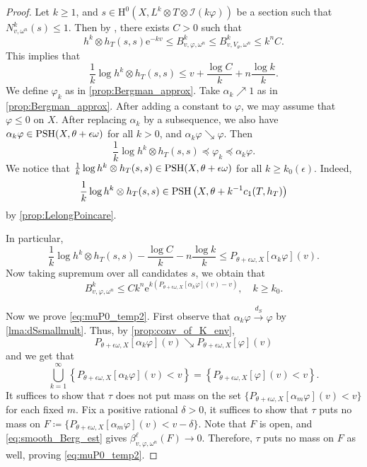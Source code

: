 \begin{proof}
Let $k\geq 1$, and $s \in \mathrm{H}^0(X,L^k \otimes T \otimes \mathcal I(k\varphi))$ be a section such that $N^k_{v,\omega^n}(s) \leq 1$. Then by \cite[Lemma~4.1]{Ber11}, there exists $C>0$ such that
\[
h^k\otimes h_T(s,s)\mathrm{e}^{-kv} \leq B^k_{v,\varphi,\omega^n} \leq B^k_{v,V_{\theta},\omega^n} \leq k^n C.
\]
This implies that
\[
\frac{1}{k}\log h^k \otimes h_T(s,s) \leq v + \frac{\log C }{k} + n \frac{\log k}{ k }.
\]
We define $\varphi_k$ as in \cref{prop:Bergman_approx}. Take $\alpha_k\nearrow 1$ as in \cref{prop:Bergman_approx}.
After adding a constant to $\varphi$, we may assume that $\varphi\leq 0$ on $X$. After replacing $\alpha_k$ by a subsequence, we also have $\alpha_k\varphi\in \mathrm{PSH}(X,\theta+\epsilon\omega)$ for all $k>0$, and $\alpha_k\varphi\searrow\varphi$.
Then
\[
\frac{1}{k}\log h^k \otimes h_T(s,s)\preceq \varphi_k\preceq \alpha_k\varphi.
\]
We notice that $\frac{1}{k}\log h^k \otimes h_T(s,s) \in \mathrm{PSH}(X, \theta + \epsilon \omega)$ for all $k \geq k_0(\epsilon)$.
Indeed,
\[
    \frac{1}{k}\log h^k\otimes h_T(s,s) \in \mathrm{PSH}\left(X,\theta+ k^{-1} c_1(T,h_T)\right)
\]
by \cref{prop:LelongPoincare}.


In particular,
\[
\frac{1}{k}\log h^k \otimes h_T(s,s)-\frac{\log C}{k}-n\frac{\log k}{k}\leq P_{\theta+\epsilon\omega,X}[\alpha_k \varphi](v).
\]
Now taking supremum over all candidates $s$, we obtain that
\begin{equation}\label{eq:smooth_Berg_est}
B^k_{v,\varphi,\omega^n} \leq C k^n \mathrm{e}^{k \left(P_{\theta +\epsilon \omega,X}[\alpha_k \varphi](v)-v\right)},\quad k \geq k_0.
\end{equation}

Now we prove \eqref{eq:muP0_temp2}. First observe that $\alpha_k\varphi\xrightarrow{d_S}\varphi$ by \cref{lma:dSsmallmult}. Thus, by \cref{prop:conv_of_K_env},
\[
P_{\theta +\epsilon \omega,X}[\alpha_k \varphi](v) \searrow P_{\theta +\epsilon \omega,X}[\varphi](v)
\]
and we get that
\[
\bigcup_{k=1}^{\infty}\left\{P_{\theta +\epsilon \omega,X}[\alpha_k \varphi](v) < v\right\}=\left\{P_{\theta +\epsilon \omega,X}[\varphi](v) < v\right\}.
\]
    It suffices to show that $\tau$ does not put mass on the set $\{P_{\theta +\epsilon \omega,X}[\alpha_m \varphi](v) < v\}$ for each fixed $m$. Fix a positive rational $\delta>0$, it suffices to show that $\tau$ puts no mass on $F\coloneqq \{P_{\theta +\epsilon \omega,X}[\alpha_m \varphi](v) < v-\delta\}$.
    Note that $F$ is open, and \eqref{eq:smooth_Berg_est} gives $\beta^\ell_{v,\varphi,\omega^n}(F)\to 0$. Therefore, $\tau$ puts no mass on $F$ as well, proving \eqref{eq:muP0_temp2}.
\end{proof}



